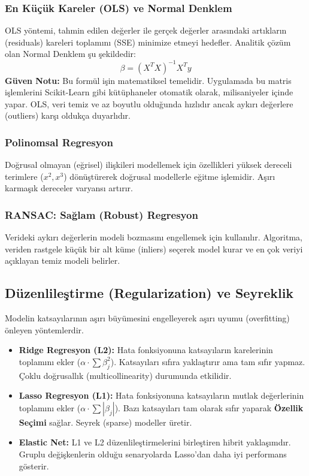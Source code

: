 \documentclass[12pt,a4paper]{article}
\begin{document}
\subsubsection{En Küçük Kareler (OLS) ve Normal Denklem}
OLS yöntemi, tahmin edilen değerler ile gerçek değerler arasındaki artıkların (residuals) kareleri toplamını (SSE) minimize etmeyi hedefler. Analitik çözüm olan Normal Denklem şu şekildedir:
\begin{equation}
    \beta = (X^T X)^{-1} X^T y
\end{equation}
\textbf{Güven Notu:} Bu formül işin matematiksel temelidir. Uygulamada bu matris işlemlerini Scikit-Learn gibi kütüphaneler otomatik olarak, milisaniyeler içinde yapar.
OLS, veri temiz ve az boyutlu olduğunda hızlıdır ancak aykırı değerlere (outliers) karşı oldukça duyarlıdır.

\subsubsection{Polinomsal Regresyon}
Doğrusal olmayan (eğrisel) ilişkileri modellemek için özellikleri yüksek dereceli terimlere ($x^2, x^3$) dönüştürerek doğrusal modellerle eğitme işlemidir. Aşırı karmaşık dereceler varyansı artırır.

\subsubsection{RANSAC: Sağlam (Robust) Regresyon}
Verideki aykırı değerlerin modeli bozmasını engellemek için kullanılır. Algoritma, veriden rastgele küçük bir alt küme (inliers) seçerek model kurar ve en çok veriyi açıklayan temiz modeli belirler.

\subsection{Düzenlileştirme (Regularization) ve Seyreklik}
Modelin katsayılarının aşırı büyümesini engelleyerek aşırı uyumu (overfitting) önleyen yöntemlerdir.

\begin{itemize}
    \item \textbf{Ridge Regresyon (L2):} Hata fonksiyonuna katsayıların karelerinin toplamını ekler ($\alpha \cdot \sum \beta_j^2$). Katsayıları sıfıra yaklaştırır ama tam sıfır yapmaz. Çoklu doğrusallık (multicollinearity) durumunda etkilidir.
    \item \textbf{Lasso Regresyon (L1):} Hata fonksiyonuna katsayıların mutlak değerlerinin toplamını ekler ($\alpha \cdot \sum |\beta_j|$). Bazı katsayıları tam olarak sıfır yaparak \textbf{Özellik Seçimi} sağlar. Seyrek (sparse) modeller üretir.
    \item \textbf{Elastic Net:} L1 ve L2 düzenlileştirmelerini birleştiren hibrit yaklaşımdır. Gruplu değişkenlerin olduğu senaryolarda Lasso'dan daha iyi performans gösterir.
\end{itemize}
\end{document}
